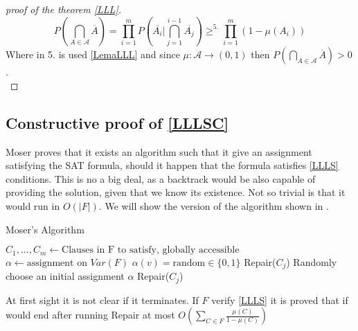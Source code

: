 \begin{proof}[proof of the theorem \ref{LLL}]
\[
P\left ( \bigcap_{A\in \mathcal{A}} \overline{A}\right ) = \prod_{i=1}^m P \left( \overline{A_i} \Big | \bigcap_{j=1}^{i-1} \overline{A_j}\right) \ge^{5.} \prod_{i=1}^m ( 1 - \mu(A_i))
\]
	Where in 5. is used \ref{LemaLLL} and since $\mu:\mathcal{A}\to (0,1)$ then $P\left ( \bigcap_{A\in \mathcal{A}} \overline{A}\right )  > 0$.\\
\end{proof}


\subsection{Constructive proof of \ref{LLLSC}}

Moser\cite{moser2013exact} proves that it exists an algorithm such that it give an assignment satisfying the SAT formula, should it happen that the formula satisfies \ref{LLLS} conditions. This is no a big deal, as a backtrack would be also capable of providing the solution, given that we know its existence. Not so trivial is that it would run in $O(|F|)$. We will show the version of the algorithm shown in \cite{schoning2013satisfiability}.



\begin{algorithm}
\caption{Moser's Algorithm}\label{euclid}
\begin{algorithmic}[1]
  \State $C_1,...,C_m \gets \text{Clauses in F to satisfy, globally accessible}$
  \State $\alpha \gets \text{assignment on }Var(F)$
  \State
  \State $\alpha(v) = \text{random} \in \{0,1\}$
  \EndFor
  \State Repair($C_j$)
  \EndIf
  \EndFor
  \EndProcedure
  \State
  \State Randomly choose an initial assignment $\alpha$
  \State Repair($C_j$)

\end{algorithmic}
\end{algorithm}


At first sight it is not clear if it terminates. If $F$ verify \ref{LLLS} it is proved that if would end after running Repair at most  $O(\sum_{C\in F} \frac{\mu(C)}{1-\mu(C)})$


